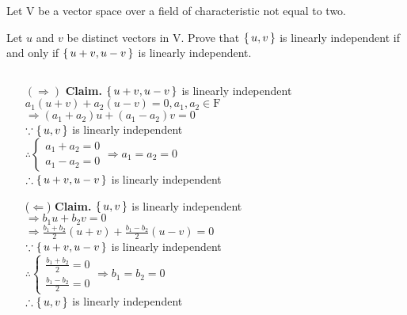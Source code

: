 Let $\mathrm{V}$ be a vector space over a field of characteristic not equal to two.

Let $u$ and $v$ be distinct vectors in $\mathrm{V}$. Prove that $\left\{ \,u,v \,\right\}$ is linearly independent if and only if $\left\{ \,u+v,u-v \,\right\}$ is linearly independent.
	
\begin{tcolorbox}
	\begin{solution}
	$ $\\
		\begin{enumerate}
			\item[$(\Rightarrow)$] \textbf{Claim.} $\left\{ \,u+v,u-v \,\right\}$ is linearly independent\\
			$a_1(u+v) + a_2(u-v) = 0, a_1,a_2 \in \mathrm{F}$\\
			$\Rightarrow (a_1+a_2)u+(a_1-a_2)v = 0$\\
			$\because \left\{ \,u,v \,\right\}$ is linearly independent\\
			$\therefore \begin{cases} a_1 + a_2 = 0\\a_1 - a_2 = 0
			\end{cases} \Rightarrow a_1 = a_2 = 0$\\
			$\therefore \left\{ \,u+v,u-v \,\right\}$ is linearly independent
			\item[($\Leftarrow$)] \textbf{Claim.} $\left\{ \,u,v \,\right\}$ is linearly independent\\
			$\Rightarrow b_1u+b_2v = 0$\\
			$\Rightarrow \frac{b_1+b_2}{2}(u+v)+\frac{b_1-b_2}{2}(u-v)=0$\\
			$\because \left\{ \,u+v,u-v \,\right\}$ is linearly independent\\
			$\therefore \begin{cases} \frac{b_1+b_2}{2} = 0 \\ \frac{b_1-b_2}{2} = 0\end{cases} \Rightarrow b_1 = b_2 = 0$\\
			$\therefore \left\{ \,u,v \,\right\} $ is linearly independent
		\end{enumerate}			
	
		
	\end{solution}
\end{tcolorbox}